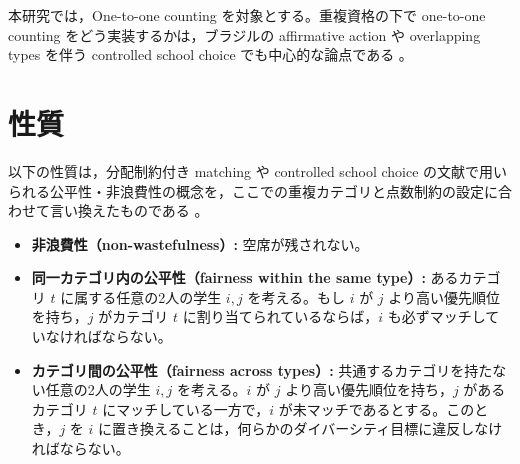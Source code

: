 \documentclass[
  12pt,
  a4paper,
  oneside,
  onecolumn,
  titlepage,
  final
]{jsarticle}
\newcommand{\1}{\mathbf{1}}
\begin{document}
本研究では，One-to-one counting を対象とする。重複資格の下で one-to-one counting をどう実装するかは，ブラジルの affirmative action や overlapping types を伴う controlled school choice でも中心的な論点である \citep{AyBo21a,KHIY17a}。


\section{性質}

以下の性質は，分配制約付き matching や controlled school choice の文献で用いられる公平性・非浪費性の概念を，ここでの重複カテゴリと点数制約の設定に合わせて言い換えたものである \citep{EHYY14a,GKK+17a,KHIY17a}。

\begin{itemize}
    \item \textbf{非浪費性（non-wastefulness）:}  
    空席が残されない。
    
    \item \textbf{同一カテゴリ内の公平性（fairness within the same type）:}  
    あるカテゴリ $t$ に属する任意の2人の学生 $i, j$ を考える。もし $i$ が $j$ より高い優先順位を持ち，$j$ がカテゴリ $t$ に割り当てられているならば，$i$ も必ずマッチしていなければならない。
    
    \item \textbf{カテゴリ間の公平性（fairness across types）:}  
    共通するカテゴリを持たない任意の2人の学生 $i, j$ を考える。$i$ が $j$ より高い優先順位を持ち，$j$ があるカテゴリ $t$ にマッチしている一方で，$i$ が未マッチであるとする。このとき，$j$ を $i$ に置き換えることは，何らかのダイバーシティ目標に違反しなければならない。
    

\end{itemize}




\end{document}
